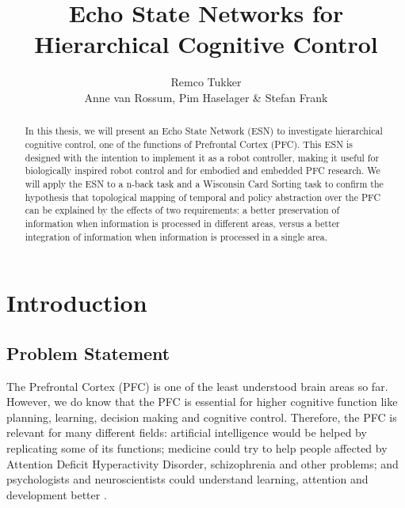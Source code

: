 \documentclass[10pt,a4paper]{report}
\author{Remco Tukker \\[0.5cm] Anne van Rossum, Pim Haselager \& Stefan Frank}
\title{Echo State Networks for \linebreak Hierarchical Cognitive Control}
\begin{document}
\maketitle

\begin{abstract}

In this thesis, we will present an Echo State Network (ESN) to investigate hierarchical cognitive control, one of the functions of Prefrontal Cortex (PFC). This ESN is designed with the intention to implement it as a robot controller, making it useful for biologically inspired robot control and for embodied and embedded PFC research. We will apply the ESN to a n-back task and a Wisconsin Card Sorting task to confirm the hypothesis that topological mapping of temporal and policy abstraction over the PFC can be explained by the effects of two requirements: a better preservation of information when information is processed in different areas, versus a better integration of information when information is processed in a single area.

\end{abstract}

\tableofcontents

\chapter{Introduction} 

\section{Problem Statement} 

The Prefrontal Cortex (PFC) is one of the least understood brain areas so far. However, we do know that the PFC is essential for higher cognitive function like planning, learning, decision making and cognitive control. Therefore, the PFC is relevant for many different fields: artificial intelligence would be helped by replicating some of its functions; medicine could try to help people affected by Attention Deficit Hyperactivity Disorder, schizophrenia and other problems; and psychologists and neuroscientists could understand learning, attention and development better \citep{fuster2008prefrontal}.
\end{document}
